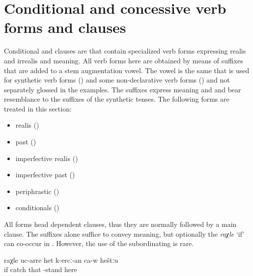 \section{Conditional and concessive verb forms and clauses}
\label{cpt:conditionalconcessiveclauses}

Conditional and  clauses are  that contain specialized verb forms expressing realis and irrealis  and  meaning. All verb forms here are obtained by means of suffixes that are added to a stem augmentation vowel. The vowel is the same that is used for synthetic verb forms () and some non-declarative verb forms () and not separately glossed in the examples. The suffixes express  meaning and  and bear resemblance to the suffixes of the synthetic tenses. The following forms are treated in this section:
%
\begin{itemize}
	\item	realis  () 
	\item	past  ()
	\item	imperfective realis  ()
	\item	imperfective past  ()
	\item	periphrastic  ()
	\item	{} conditionals ()
\end{itemize}

All  forms head dependent clauses, thus they are normally followed by a main clause. The  suffixes alone suffice to convey  meaning, but optionally the  \textit{raχle} `if' can co-occur in  . However, the use of the subordinating  is rare.

\begin{exe}
	\ex	\label{ex:If (he) caught him, he must stand there}
	\gll	raχle	uc-arre	het	k-ercː-an	ca-w	heštːu\\
		if	catch	that	-stand		here\\
	\glt	{}
\end{exe}


